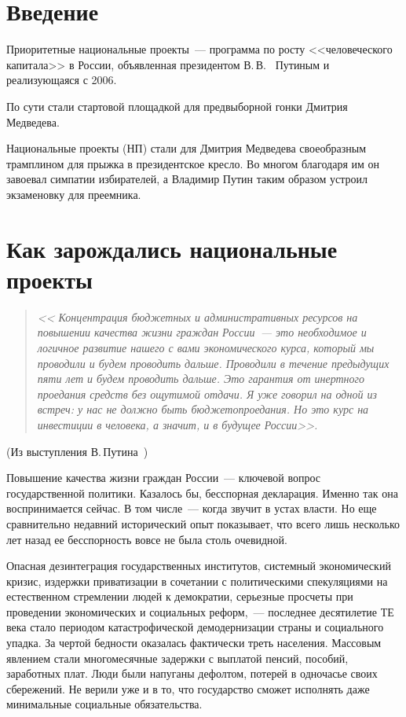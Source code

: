 \documentclass[article, 12pt, russian, oneside]{ncc}
\begin{document}
 \thispagestyle{empty}
\tableofcontents
\newpage

\section*{Введение}

Приоритетные национальные проекты~--- программа по росту <<человеческого капитала>> в России, объявленная президентом В.\,В.~ Путиным и реализующаяся с 2006.

По сути стали стартовой площадкой для предвыборной гонки Дмитрия Медведева.

Национальные проекты (НП) стали для Дмитрия Медведева своеобразным трамплином для прыжка в президентское кресло. Во многом благодаря им он завоевал симпатии избирателей, а Владимир Путин таким образом устроил экзаменовку для преемника.
\newpage

\section{Как зарождались национальные проекты}

\begin{quote}
  \emph{<< Концентрация бюджетных и административных ресурсов на
    повышении качества жизни граждан России~--- это необходимое и
    логичное развитие нашего с вами экономического курса, который мы
    проводили и будем проводить дальше. Проводили в течение предыдущих
    пяти лет и будем проводить дальше. Это гарантия от инертного
    проедания средств без ощутимой отдачи. Я уже говорил на одной из
    встреч: у нас не должно быть бюджетопроедания. Но это курс на
    инвестиции в человека, а значит, и в будущее России>>.}
\end{quote}
\begin{flushright}
  (Из выступления В.\,Путина~\cite{Putin_RG})
\end{flushright}

Повышение качества жизни граждан России~--- ключевой вопрос
государственной политики. Казалось бы, бесспорная декларация. Именно
так она воспринимается сейчас. В том числе~--- когда звучит в устах
власти. Но еще сравнительно недавний исторический опыт показывает, что
всего лишь несколько лет назад ее бесспорность вовсе не была столь
очевидной.

Опасная дезинтеграция государственных институтов, системный
экономический кризис, издержки приватизации в сочетании с
политическими спекуляциями на естественном стремлении людей к
демократии, серьезные просчеты при проведении экономических и
социальных реформ,~--- последнее десятилетие ТЕ века стало периодом
катастрофической демодернизации страны и социального упадка. За чертой
бедности оказалась фактически треть населения. Массовым явлением стали
многомесячные задержки с выплатой пенсий, пособий, заработных
плат. Люди были напуганы дефолтом, потерей в одночасье своих
сбережений. Не верили уже и в то, что государство сможет исполнять
даже минимальные социальные обязательства.
\end{document}
